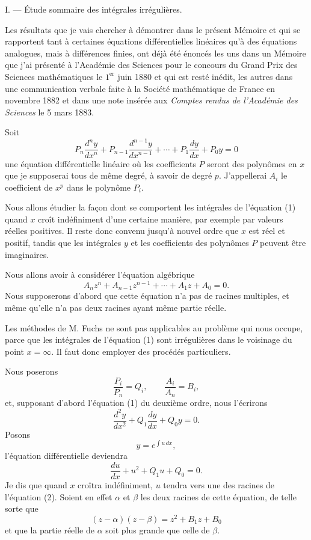 \documentclass[11pt]{article}
\begin{document}
\begin{center}
I. --- Étude sommaire des intégrales irrégulières.
\end{center}

Les résultats que je vais chercher à démontrer dans le présent Mémoire et qui se rapportent tant à certaines équations différentielles linéaires qu'à des équations analogues, mais à différences finies, ont déjà été énoncés les uns dans un Mémoire que j'ai présenté à l'Académie des Sciences pour le concours du Grand Prix des Sciences mathématiques le $1^{\mathrm{er}}$ juin 1880 et qui est resté inédit, les autres dans une communication verbale faite à la Société mathématique de France en novembre 1882 et dans une note insérée aux \emph{Comptes rendus de l'Académie des Sciences} le 5 mars 1883.

Soit
\[
\tag{1}
P_n\frac{d^ny}{dx^n}+P_{n-1}\frac{d^{n-1}y}{dx^{n-1}}+\cdots+P_1\frac{dy}{dx}+P_0y=0
\]
une équation différentielle linéaire où les coefficients $P$ seront des polynômes en $x$ que je supposerai tous de même degré, à savoir de degré $p$. J'appellerai $A_i$ le coefficient de $x^p$ dans le polynôme $P_i$.

Nous allons étudier la façon dont se comportent les intégrales de l'équation (1) quand $x$ croît indéfiniment d'une certaine manière, par exemple par valeurs réelles positives. Il reste donc convenu jusqu'à nouvel ordre que $x$ est réel et positif, tandis que les intégrales $y$ et les coefficients des polynômes $P$ peuvent être imaginaires.

Nous allons avoir à considérer l'équation algébrique
\[
\tag{2}
A_nz^n+A_{n-1}z^{n-1}+\cdots+A_1z+A_0=0.
\]
Nous supposerons d'abord que cette équation n'a pas de racines multiples, et même qu'elle n'a pas deux racines ayant même partie réelle.

Les méthodes de M. Fuchs ne sont pas applicables au problème qui nous occupe, parce que les intégrales de l'équation (1) sont irrégulières dans le voisinage du point $x=\infty$. Il faut donc employer des procédés particuliers.

Nous poserons
\[
\frac{P_i}{P_n}=Q_i,
\qquad
\frac{A_i}{A_n}=B_i,
\]
et, supposant d'abord l'équation (1) du deuxième ordre, nous l'écrirons
\[
\frac{d^2y}{dx^2}+Q_1\frac{dy}{dx}+Q_0y=0.
\]
Posons
\[
y=e^{\int u\,dx},
\]
l'équation différentielle deviendra
\[
\frac{du}{dx}+u^2+Q_1u+Q_0=0.
\]
Je dis que quand $x$ croîtra indéfiniment, $u$ tendra vers une des racines de l'équation (2). Soient en effet $\alpha$ et $\beta$ les deux racines de cette équation, de telle sorte que
\[
(z-\alpha)(z-\beta)=z^2+B_1z+B_0
\]
et que la partie réelle de $\alpha$ soit plus grande que celle de $\beta$.
\end{document}
